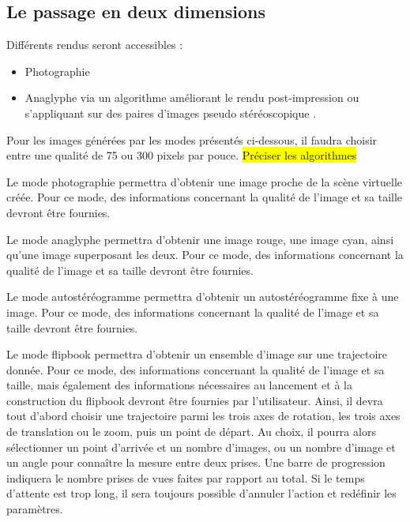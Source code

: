 \subsection{Le passage en deux dimensions}
\begin{description}[style=nextline]
	\item[Mode de passage en deux dimensions]
	Différents rendus seront accessibles : 
	\begin{itemize}
			\item Photographie
			\item Anaglyphe via un algorithme améliorant le rendu post-impression \cite{printAnaglyph} ou s’appliquant sur des paires d’images pseudo stéréoscopique \cite{steteroAnaglyph}. 			
	\end{itemize}
	Pour les images générées par les modes présentés ci-dessous, il faudra choisir entre une qualité de 75 ou 300 pixels par pouce. \colorbox{yellow}{Préciser les algorithmes} 
	
	\item[Mode photographie]
	\mbox{\hspace{1cm}} Le mode photographie permettra d’obtenir une image proche de la scène virtuelle créée. Pour ce mode, des informations concernant la qualité de l’image et sa taille devront être fournies.
	
	\item[Mode analgyphe]	
	\mbox{\hspace{1cm}}Le mode anaglyphe permettra d’obtenir une image rouge, une image cyan, ainsi qu’une image superposant les deux. Pour ce mode, des informations concernant la qualité de l’image et sa taille devront être fournies.
	
	\item[Mode autostéréogramme]	
	\mbox{\hspace{1cm}}Le mode autostéréogramme permettra d’obtenir un autostéréogramme fixe à une image. Pour ce mode, des informations concernant la qualité de l’image et sa taille devront être fournies.
	
	\item[Mode flipbook]	
	\mbox{\hspace{1cm}}Le mode flipbook permettra d’obtenir un ensemble d’image sur une trajectoire donnée. Pour ce mode, des informations concernant la qualité de l’image et sa taille, mais également des informations nécessaires au lancement et à la construction du flipbook devront être fournies par l’utilisateur. Ainsi, il devra tout d’abord choisir une trajectoire parmi les trois axes de rotation, les trois axes de translation ou le zoom, puis un point de départ. Au choix, il pourra alors sélectionner un point d’arrivée et un nombre d’images, ou un nombre d’image et un angle pour connaître la mesure entre deux prises. Une barre de progression indiquera le nombre prises de vues faites par rapport au total. Si le temps d’attente est trop long, il sera toujours possible d’annuler l’action et redéfinir les paramètres.
	

\end{description}
